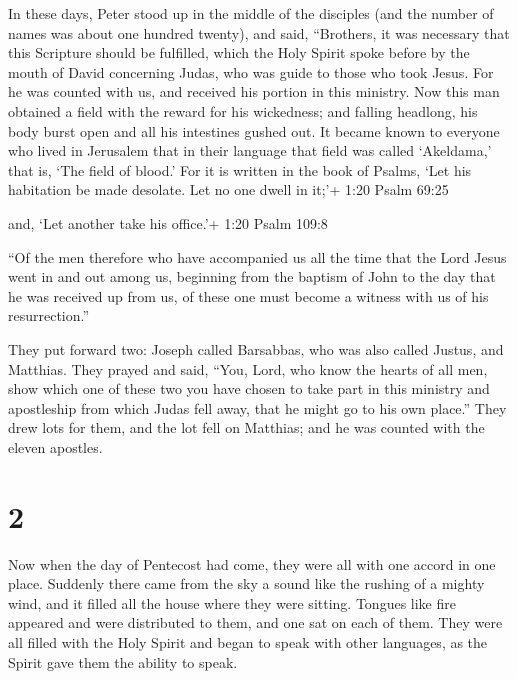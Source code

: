  In these days, Peter stood up in the middle of the
disciples (and the number of names was about one hundred twenty), and
said,  ``Brothers, it was necessary that this Scripture
should be fulfilled, which the Holy Spirit spoke before by the mouth of
David concerning Judas, who was guide to those who took Jesus.
 For he was counted with us, and received his portion in
this ministry.  Now this man obtained a field with the
reward for his wickedness; and falling headlong, his body burst open and
all his intestines gushed out.  It became known to everyone
who lived in Jerusalem that in their language that field was called
`Akeldama,' that is, `The field of blood.'  For it is
written in the book of Psalms, `Let his habitation be made desolate. Let
no one dwell in it;'+ 1:20 Psalm 69:25

and, `Let another take his office.'+ 1:20 Psalm 109:8

 ``Of the men therefore who have accompanied us all the
time that the Lord Jesus went in and out among us, 
beginning from the baptism of John to the day that he was received up
from us, of these one must become a witness with us of his
resurrection.''

 They put forward two: Joseph called Barsabbas, who was
also called Justus, and Matthias.  They prayed and said,
``You, Lord, who know the hearts of all men, show which one of these two
you have chosen  to take part in this ministry and
apostleship from which Judas fell away, that he might go to his own
place.''  They drew lots for them, and the lot fell on
Matthias; and he was counted with the eleven apostles.

\hypertarget{section-1}{%
\section{2}\label{section-1}}

 Now when the day of Pentecost had come, they were all with
one accord in one place.  Suddenly there came from the sky a
sound like the rushing of a mighty wind, and it filled all the house
where they were sitting.  Tongues like fire appeared and
were distributed to them, and one sat on each of them.  They
were all filled with the Holy Spirit and began to speak with other
languages, as the Spirit gave them the ability to speak.

